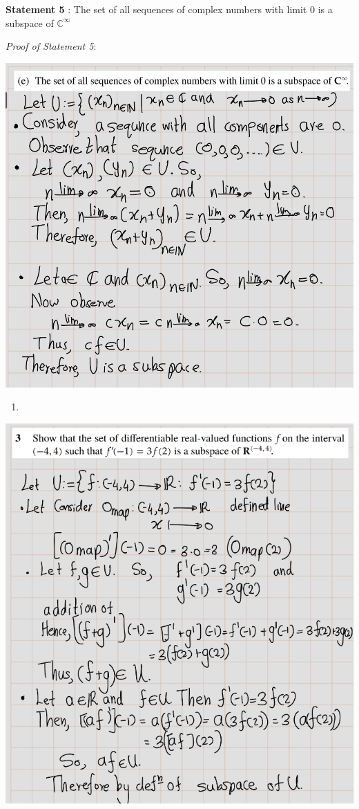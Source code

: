 \documentclass[
]{book}
\providecommand{\tightlist}{%
  \setlength{\itemsep}{0pt}\setlength{\parskip}{0pt}}
\theoremstyle{definition}
\theoremstyle{definition}
\theoremstyle{definition}
\theoremstyle{definition}
\theoremstyle{remark}
\begin{document}
\textbf{Statement 5} : The set of all sequences of complex numbers with limit \(0\) is a subspace of \(\mathbb{C}^{\infty}\)

\emph{Proof of Statement 5}:

\includegraphics[width=12.33in]{fig/Ex1C/Ex2-e}

\begin{enumerate}
\def\labelenumi{\arabic{enumi}.}
\setcounter{enumi}{2}
\tightlist
\item
\end{enumerate}

\includegraphics[width=9.62in]{fig/Ex1C/Ex3}

  
\end{document}
